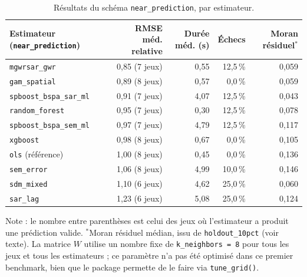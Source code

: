 \documentclass[11pt,a4paper]{article}
\begin{document}
\begin{table}[H]
\centering
\small
\begin{tabular}{lrrrr}
\toprule
Estimateur (\texttt{near\_prediction}) & RMSE méd. relative & Durée méd. (s) & Échecs & Moran résiduel$^{*}$ \\
\midrule
\texttt{mgwrsar\_gwr} & 0,85 (7 jeux) & 0,55 & 12,5\,\% & 0,059 \\
\texttt{gam\_spatial} & 0,89 (8 jeux) & 0,57 & 0,0\,\% & 0,059 \\
\texttt{spboost\_bspa\_sar\_ml} & 0,91 (7 jeux) & 4,07 & 12,5\,\% & 0,043 \\
\texttt{random\_forest} & 0,95 (7 jeux) & 0,30 & 12,5\,\% & 0,078 \\
\texttt{spboost\_bspa\_sem\_ml} & 0,97 (7 jeux) & 4,79 & 12,5\,\% & 0,117 \\
\texttt{xgboost} & 0,98 (8 jeux) & 0,67 & 0,0\,\% & 0,105 \\
\texttt{ols} (référence) & 1,00 (8 jeux) & 0,45 & 0,0\,\% & 0,136 \\
\texttt{sem\_error} & 1,06 (8 jeux) & 4,99 & 10,0\,\% & 0,146 \\
\texttt{sdm\_mixed} & 1,10 (6 jeux) & 4,62 & 25,0\,\% & 0,060 \\
\texttt{sar\_lag} & 1,23 (6 jeux) & 5,08 & 25,0\,\% & 0,124 \\
\bottomrule
\end{tabular}
\vspace{0.15cm}

\raggedright\scriptsize Note : le nombre entre parenthèses est celui des jeux où l'estimateur a produit une prédiction valide. $^{*}$Moran résiduel médian, issu de \texttt{holdout\_10pct} (voir texte). La matrice $W$ utilise un nombre fixe de \texttt{k\_neighbors = 8} pour tous les jeux et tous les estimateurs ; ce paramètre n'a pas été optimisé dans ce premier benchmark, bien que le package permette de le faire via \texttt{tune\_grid()}.
\caption{Résultats du schéma \texttt{near\_prediction}, par estimateur.}
\label{tab:resultats-benchmark}
\end{table}
\end{document}
